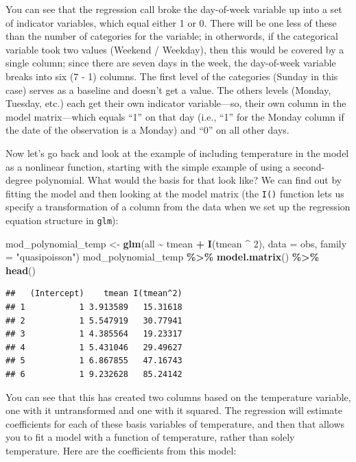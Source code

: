 \documentclass[
]{book}
\newenvironment{Shaded}{\begin{snugshade}}{\end{snugshade}}
\newcommand{\AttributeTok}[1]{\textcolor[rgb]{0.13,0.29,0.53}{#1}}
\newcommand{\DecValTok}[1]{\textcolor[rgb]{0.00,0.00,0.81}{#1}}
\newcommand{\FunctionTok}[1]{\textcolor[rgb]{0.13,0.29,0.53}{\textbf{#1}}}
\newcommand{\NormalTok}[1]{#1}
\newcommand{\OtherTok}[1]{\textcolor[rgb]{0.56,0.35,0.01}{#1}}
\newcommand{\SpecialCharTok}[1]{\textcolor[rgb]{0.81,0.36,0.00}{\textbf{#1}}}
\newcommand{\StringTok}[1]{\textcolor[rgb]{0.31,0.60,0.02}{#1}}
\begin{document}
You can see that the regression call broke the day-of-week variable up into a set of indicator variables, which
equal either 1 or 0. There will be one less of these than the number of categories for the
variable; in otherwords, if the categorical variable took two values (Weekend / Weekday), then
this would be covered by a single column; since there are seven days in the week, the
day-of-week variable breaks into six (7 - 1) columns. The first level of the categories
(Sunday in this case) serves as a baseline and doesn't get a value. The others levels
(Monday, Tuesday, etc.) each get their own indicator variable---so, their own column in
the model matrix---which equals ``1'' on that day (i.e., ``1'' for the Monday column if the date
of the observation is a Monday) and ``0'' on all other days.

Now let's go back and look at the example of including temperature in the model as a nonlinear
function, starting with the simple example of using a second-degree polynomial. What would
the basis for that look like? We can find out by fitting the model and then looking at the
model matrix (the \texttt{I()} function lets us specify a transformation of a column from the
data when we set up the regression equation structure in \texttt{glm}):

\begin{Shaded}
\begin{Highlighting}[]
\NormalTok{mod\_polynomial\_temp }\OtherTok{\textless{}{-}} \FunctionTok{glm}\NormalTok{(all }\SpecialCharTok{\textasciitilde{}}\NormalTok{ tmean }\SpecialCharTok{+} \FunctionTok{I}\NormalTok{(tmean }\SpecialCharTok{\^{}} \DecValTok{2}\NormalTok{), }
                           \AttributeTok{data =}\NormalTok{ obs, }\AttributeTok{family =} \StringTok{"quasipoisson"}\NormalTok{)}
\NormalTok{mod\_polynomial\_temp }\SpecialCharTok{\%\textgreater{}\%} 
  \FunctionTok{model.matrix}\NormalTok{() }\SpecialCharTok{\%\textgreater{}\%} 
  \FunctionTok{head}\NormalTok{()}
\end{Highlighting}
\end{Shaded}

\begin{verbatim}
##   (Intercept)    tmean I(tmean^2)
## 1           1 3.913589   15.31618
## 2           1 5.547919   30.77941
## 3           1 4.385564   19.23317
## 4           1 5.431046   29.49627
## 5           1 6.867855   47.16743
## 6           1 9.232628   85.24142
\end{verbatim}

You can see that this has created two columns based on the temperature variable, one with
it untransformed and one with it squared. The regression will estimate coefficients for each
of these basis variables of temperature, and then that allows you to fit a model with a
function of temperature, rather than solely temperature. Here are the coefficients from
this model:
\end{document}
